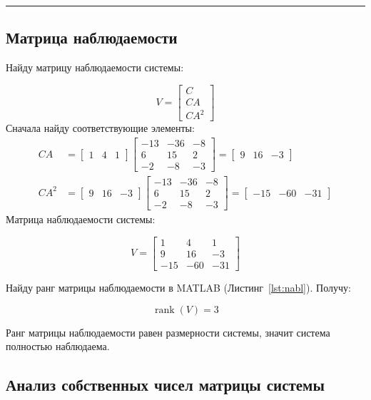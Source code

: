 \documentclass[a4paper,12pt]{article}
\begin{document}
	\hrule
	
	\newpage
	\subsection{Матрица наблюдаемости}
	
	Найду матрицу наблюдаемости системы:
	
	\[
	V = 
	\begin{bmatrix}
		C \\ CA \\ CA^2
	\end{bmatrix}
	\]
	Сначала найду соответствующие элементы:	
\[
\begin{aligned}
	CA &=
	\begin{bmatrix}
		1 & 4 & 1
	\end{bmatrix}
	\begin{bmatrix}
		-13 & -36 & -8 \\
		6 & 15 & 2 \\
		-2 & -8 & -3
	\end{bmatrix}
	=
	\begin{bmatrix}
		9 & 16 & -3
	\end{bmatrix}
	\\[6pt]
	CA^2 &=
	\begin{bmatrix}
		9 & 16 & -3
	\end{bmatrix}
	\begin{bmatrix}
		-13 & -36 & -8 \\
		6 & 15 & 2 \\
		-2 & -8 & -3
	\end{bmatrix}
	=
	\begin{bmatrix}
		-15 & -60 & -31
	\end{bmatrix}
\end{aligned}
\]
	Матрица наблюдаемости системы:

	\[
	V = 
	\begin{bmatrix}
		1 & 4 & 1 \\
		9 & 16 & -3 \\
		-15 & -60 & -31
	\end{bmatrix}
	\]
	
	Найду ранг матрицы наблюдаемости в MATLAB (Листинг~\ref{lst:nabl}). Получу:
	
	\[\operatorname{rank}(V) = 3\]
	
	Ранг матрицы наблюдаемости равен размерности системы, значит система полностью наблюдаема.
	
	\subsection{Анализ собственных чисел матрицы системы}
	
\end{document}
